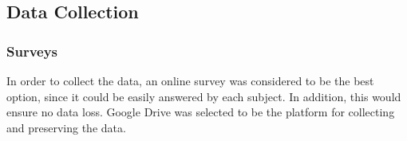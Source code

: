 %
%

\subsection{Data Collection}


\subsubsection{Surveys}
In order to collect the data, an online survey was considered to be the best option, since it could be easily answered by each subject. In addition, this would ensure no data loss. Google Drive \texttrademark \cite{google_drive} was selected to be the platform for collecting and preserving the data.

